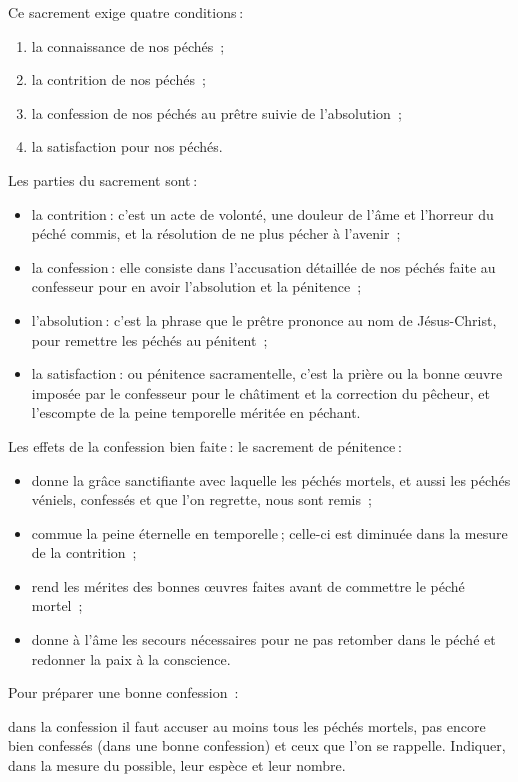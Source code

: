 \documentclass[%
a5paper%
,11pt%
,DIV=15%
,titlepage=on%
,headings=optiontoheadandtoc%
,headings=small%
,parskip=false%
,titlepage%
,openany%
]{scrbook}
\begin{document}
Ce sacrement exige quatre conditions :
\begin{enumerate}
\item la connaissance de nos péchés ;
\item la contrition de nos péchés ;
\item la confession de nos péchés au prêtre suivie de l’absolution ;
\item la satisfaction pour nos péchés.
\end{enumerate}

Les parties du sacrement sont :
\begin{itemize}
\item la contrition : c’est un acte de volonté, une douleur de l’âme et l’horreur du péché commis, et la résolution de ne plus pécher à l’avenir ;
\item la confession : elle consiste dans l’accusation détaillée de nos péchés faite au confesseur pour en avoir l’absolution et la pénitence ;
\item l'absolution : c’est la phrase que le prêtre prononce au nom de Jésus-Christ, pour remettre les péchés au pénitent ;
\item la satisfaction : ou pénitence sacramentelle, c’est la prière ou la bonne œuvre imposée par le confesseur pour le châtiment et la correction du pêcheur, et l’escompte de la peine temporelle méritée en péchant.
\end{itemize}

Les effets de la confession bien faite : le sacrement de pénitence :
\begin{itemize}
\item donne la grâce sanctifiante avec laquelle les péchés mortels, et aussi les péchés véniels, confessés et que l'on regrette, nous sont remis ;
\item commue la peine éternelle en temporelle ; celle-ci est diminuée dans la mesure de la contrition ;
\item rend les mérites des bonnes œuvres faites avant de commettre le péché
mortel ;
\item donne à l’âme les secours nécessaires pour ne pas retomber dans le péché et redonner la paix à la conscience.
\end{itemize}

Pour préparer une bonne confession :

dans la confession il faut accuser au moins tous les péchés mortels, pas encore bien confessés (dans une bonne confession) et ceux que l’on se rappelle. Indiquer, dans la mesure du possible, leur espèce et leur nombre.
\end{document}
